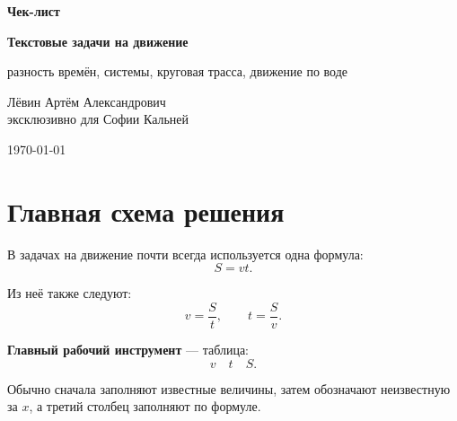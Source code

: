 \documentclass[a4paper,12pt]{article}
\newcommand{\important}[1]{\textcolor{darkaccent}{\textbf{#1}}}
\begin{document}
\begin{titlepage}
\thispagestyle{empty}
\begin{center}
\vspace*{25mm}

{\Large \textcolor{accent}{\textbf{Чек-лист}}}

\vspace{8mm}

{\Huge \textbf{Текстовые задачи на движение}}

\vspace{4mm}

{\Large разность времён, системы, круговая трасса, движение по воде}

\vspace{22mm}

{\large Лёвин Артём Александрович\\[1mm]
эксклюзивно для Софии Кальней}

\vspace{12mm}

{\large \today}

\vfill


\vspace{8mm}
\end{center}
\end{titlepage}

\tableofcontents
\newpage

\section{Главная схема решения}

В задачах на движение почти всегда используется одна формула:
\[
S=vt.
\]

Из неё также следуют:
\[
v=\frac{S}{t}, \qquad t=\frac{S}{v}.
\]

\important{Главный рабочий инструмент} --- таблица:
\[
v \quad t \quad S.
\]

Обычно сначала заполняют известные величины, затем обозначают неизвестную за $x$, а третий столбец заполняют по формуле.
\end{document}
